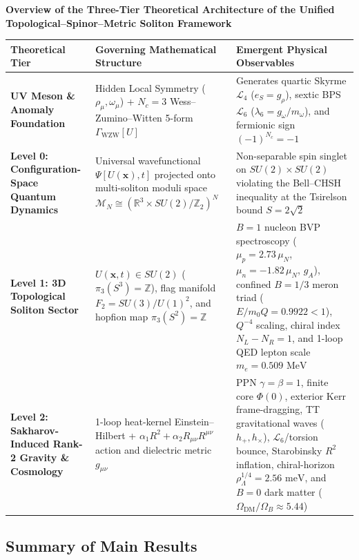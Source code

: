 \documentclass[10pt,aps,prd,twocolumn,superscriptaddress,nofootinbib,floatfix,longbibliography,showkeys]{revtex4-2}
\makeatletter
\newcommand{\raggedpcolumns}{\expandafter\def\expandafter\@arrayparboxrestore\expandafter{\@arrayparboxrestore\raggedright\let\\\tabularnewline}}
\makeatother
\begin{document}
\begin{table}[t]
\centering
{}\label{tab:arch}\textbf{Overview of the Three-Tier Theoretical Architecture of the Unified Topological--Spinor--Metric Soliton Framework}\\[4pt]
\footnotesize\raggedpcolumns
\begin{tabular}{p{}p{}p{}}
\toprule
\textbf{Theoretical Tier} & \textbf{Governing Mathematical Structure} & \textbf{Emergent Physical Observables} \\
\midrule
\textbf{UV Meson \& Anomaly Foundation} & Hidden Local Symmetry ($\rho_\mu, \omega_\mu$) + $N_c=3$ Wess--Zumino--Witten 5-form $\Gamma_{\text{WZW}}[U]$ & Generates quartic Skyrme $\mathcal{L}_4$ ($e_S = g_\rho$), sextic BPS $\mathcal{L}_6$ ($\lambda_6 = g_\omega/m_\omega$), and fermionic sign $(-1)^{N_c} = -1$ \\
\addlinespace
\textbf{Level 0: Configuration-Space Quantum Dynamics} & Universal wavefunctional $\Psi[U(\mathbf{x}), t]$ projected onto multi-soliton moduli space $\mathcal{M}_N \cong (\mathbb{R}^3 \times SU(2)/\mathbb{Z}_2)^N$ & Non-separable spin singlet on $SU(2)\times SU(2)$ violating the Bell--CHSH inequality at the Tsirelson bound $S = 2\sqrt{2}$ \\
\addlinespace
\textbf{Level 1: 3D Topological Soliton Sector} & $U(\mathbf{x}, t) \in SU(2)$ ($\pi_3(S^3)=\mathbb{Z}$), flag manifold $F_2 = SU(3)/U(1)^2$, and hopfion map $\pi_3(S^2)=\mathbb{Z}$ & $B=1$ nucleon BVP spectroscopy ($\mu_p = 2.73\,\mu_N$, $\mu_n = -1.82\,\mu_N$, $g_A$), confined $B=1/3$ meron triad ($E/m_0 Q = 0.9922 < 1$), $Q^{-4}$ scaling, chiral index $N_L - N_R = 1$, and 1-loop QED lepton scale $m_e = 0.509\text{ MeV}$ \\
\addlinespace
\textbf{Level 2: Sakharov-Induced Rank-2 Gravity \& Cosmology} & 1-loop heat-kernel Einstein--Hilbert + $\alpha_1 R^2 + \alpha_2 R_{\mu\nu}R^{\mu\nu}$ action and dielectric metric $g_{\mu\nu}$ & PPN $\gamma=\beta=1$, finite core $\Phi(0)$, exterior Kerr frame-dragging, TT gravitational waves ($h_+, h_\times$), $\mathcal{L}_6$/torsion bounce, Starobinsky $R^2$ inflation, chiral-horizon $\rho_\Lambda^{1/4} = 2.56\text{ meV}$, and $B=0$ dark matter ($\Omega_{\text{DM}}/\Omega_B \approx 5.44$) \\
\bottomrule
\end{tabular}
\end{table}



\subsection{Summary of Main Results}\label{sec:1.2}
\end{document}
